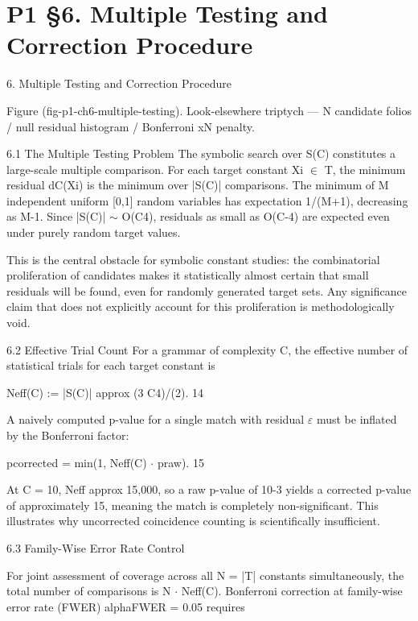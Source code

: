 
\section{P1 §6. Multiple Testing and Correction Procedure}

6. Multiple Testing and Correction Procedure

   Figure (fig-p1-ch6-multiple-testing). Look-elsewhere triptych --- N candidate folios / null residual
                                  histogram / Bonferroni xN penalty.

  6.1 The Multiple Testing Problem
  The symbolic search over S(C) constitutes a large-scale multiple comparison. For each
  target constant Xi $\in$ T, the minimum residual dC(Xi) is the minimum over |S(C)|
  comparisons. The minimum of M independent uniform [0,1] random variables has
  expectation 1/(M+1), decreasing as M-1. Since |S(C)| $\sim$ O(C4), residuals as small as
  O(C-4) are expected even under purely random target values.

  This is the central obstacle for symbolic constant studies: the combinatorial
  proliferation of candidates makes it statistically almost certain that small residuals will
  be found, even for randomly generated target sets. Any significance claim that does not
  explicitly account for this proliferation is methodologically void.

  6.2 Effective Trial Count
  For a grammar of complexity C, the effective number of statistical trials for each target
  constant is

  Neff(C) := |S(C)| approx (3 C4)/(2). 14

  A naively computed p-value for a single match with residual $\varepsilon$ must be inflated by the
  Bonferroni factor:

  pcorrected = min(1, Neff(C) $\cdot$ praw). 15

  At C = 10, Neff approx 15{,}000, so a raw p-value of 10-3 yields a corrected p-value of
  approximately 15, meaning the match is completely non-significant. This illustrates why
  uncorrected coincidence counting is scientifically insufficient.

  6.3 Family-Wise Error Rate Control

  For joint assessment of coverage across all N = |T| constants simultaneously, the total
  number of comparisons is N $\cdot$ Neff(C). Bonferroni correction at family-wise error rate
  (FWER) alphaFWER = 0.05 requires

